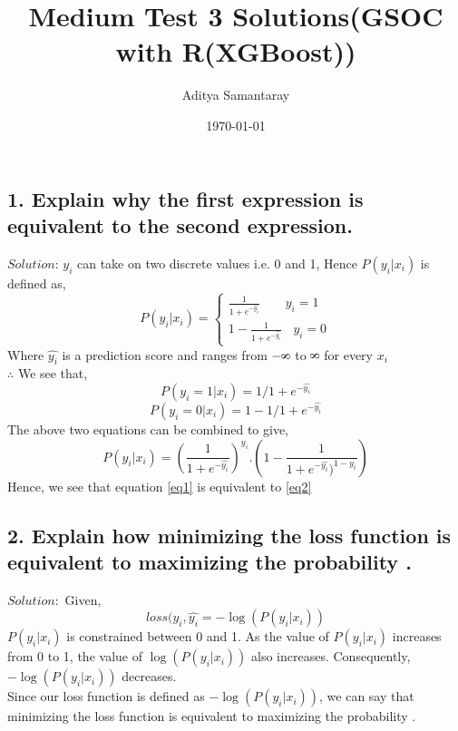 \documentclass[12pt]{extarticle}
\title{Medium Test 3 Solutions(GSOC with R(XGBoost))}
\author{Aditya Samantaray}
\date{\today}
\newcommand{\infinity}{\rotatebox{90}{8}}
\newcommand{\<}{\langle}
\renewcommand{\>}{\rangle}
\theoremstyle{definition}
\begin{document}
\maketitle
\raggedright
\subsection*{1. Explain why the first expression is equivalent to the second expression.}
$Solution$:  $y_i$ can take on two discrete values i.e. 0 and 1, Hence $P(y_i|x_i)$ is defined as,
\begin{equation}
 P(y_i|x_i) = \begin{cases}
               \frac{1}{1 + e^{- \hat{y_i}}}~~~~~~~~~ y_i=1\\
               1-\frac{1}{1 + e^{- \hat{y_i}}} ~~~~ y_i=0
            \end{cases}
\label{eq1}\end{equation}
Where $\hat{y_i}$ is a prediction score and ranges from $-\infinity$ to $\infinity$ for every $x_i$\\
$\therefore$ We see that,
\begin{equation}
 P(y_i=1|x_i) = 1/{1+e^{-\hat{y_i}}}
\end{equation}
\begin{equation}
 P(y_i=0|x_i) = 1 - 1/{1+e^{-\hat{y_i}}}
\end{equation}
The above two equations can be combined to give,
\begin{equation}
 P(y_i|x_i) = (\frac{1}{1+e^{-\hat{y_i}}})^{y_i}.(1 - \frac{1}{1+e^{-\hat{y_i}})^{1-y_i}})
\label{eq2}\end{equation}
Hence, we see that equation \eqref{eq1} is equivalent to \eqref{eq2}
\newline\newline


\subsection*{2. Explain how minimizing the loss function  is equivalent to maximizing the probability .}
$Solution:$ Given,
\begin{equation}
 loss(y_i,\hat{y_i} = -\log(P(y_i|x_i))
\end{equation}
$P(y_i|x_i)$ is constrained between 0 and 1. As the value of $P(y_i|x_i)$ increases from 0 to 1, the value of $\log{(P(y_i|x_i))}$ also increases. Consequently, $-\log{(P(y_i|x_i))}$ decreases.\\Since our loss function is defined as $-\log{(P(y_i|x_i))}$, we can say that minimizing the loss function  is equivalent to maximizing the probability .
\newline\newline
\end{document}
